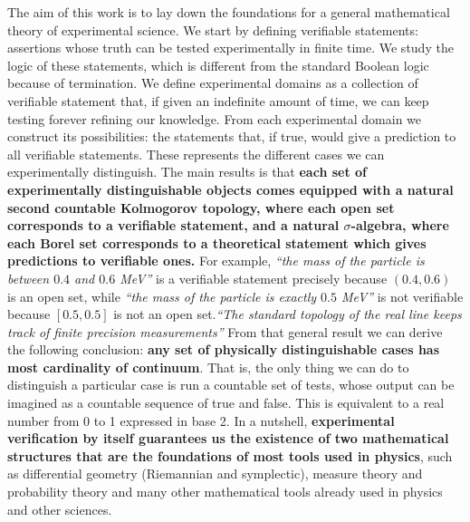 \documentclass[letterpaper]{article}
\theoremstyle{plain}%
\theoremstyle{definition}
\theoremstyle{remark}
\numberwithin{equation}{section}
\newcommand{\statement}[1] {\emph{``#1''}}
\begin{document}
The aim of this work is to lay down the foundations for a general mathematical theory of experimental science. We start by defining verifiable statements: assertions whose truth can be tested experimentally in finite time. We study the logic of these statements, which is different from the standard Boolean logic because of termination. We define experimental domains as a collection of verifiable statement that, if given an indefinite amount of time, we can keep testing forever refining our knowledge. From each experimental domain we construct its possibilities: the statements that, if true, would give a prediction to all verifiable statements. These represents the different cases we can experimentally distinguish. The main results is that \textbf{each set of experimentally distinguishable objects comes equipped with a natural second countable Kolmogorov topology, where each open set corresponds to a verifiable statement, and a natural $\sigma$-algebra, where each Borel set corresponds to a theoretical statement which gives predictions to verifiable ones.} For example, \statement{the mass of the particle is between $0.4$ and $0.6$ MeV} is a verifiable statement precisely because $(0.4, 0.6)$ is an open set, while \statement{the mass of the particle is exactly $0.5$ MeV} is not verifiable because $[0.5,0.5]$ is not an open set.\statement{The standard topology of the real line keeps track of finite precision measurements} From that general result we can derive the following conclusion: \textbf{any set of physically distinguishable cases has most cardinality of continuum}. That is, the only thing we can do to distinguish a particular case is run a countable set of tests, whose output can be imagined as a countable sequence of true and false. This is equivalent to a real number from 0 to 1 expressed in base 2. In a nutshell, \textbf{experimental verification by itself guarantees us the existence of two mathematical structures that are the foundations of most tools used in physics}, such as differential geometry (Riemannian and symplectic), measure theory and probability theory and many other mathematical tools already used in physics and other sciences.

\end{document}
